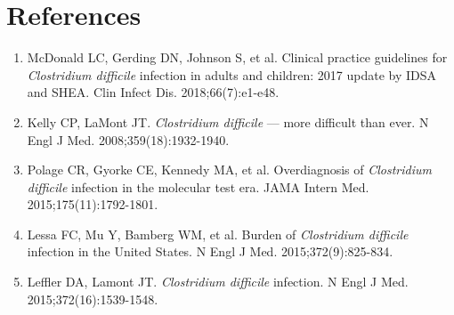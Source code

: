 \section*{References}
\begin{enumerate}
  \item McDonald LC, Gerding DN, Johnson S, et al. Clinical practice guidelines for \textit{Clostridium difficile} infection in adults and children: 2017 update by IDSA and SHEA. Clin Infect Dis. 2018;66(7):e1-e48.
  \item Kelly CP, LaMont JT. \textit{Clostridium difficile} --- more difficult than ever. N Engl J Med. 2008;359(18):1932-1940.
  \item Polage CR, Gyorke CE, Kennedy MA, et al. Overdiagnosis of \textit{Clostridium difficile} infection in the molecular test era. JAMA Intern Med. 2015;175(11):1792-1801.
  \item Lessa FC, Mu Y, Bamberg WM, et al. Burden of \textit{Clostridium difficile} infection in the United States. N Engl J Med. 2015;372(9):825-834.
  \item Leffler DA, Lamont JT. \textit{Clostridium difficile} infection. N Engl J Med. 2015;372(16):1539-1548.
\end{enumerate}

\clearpage
